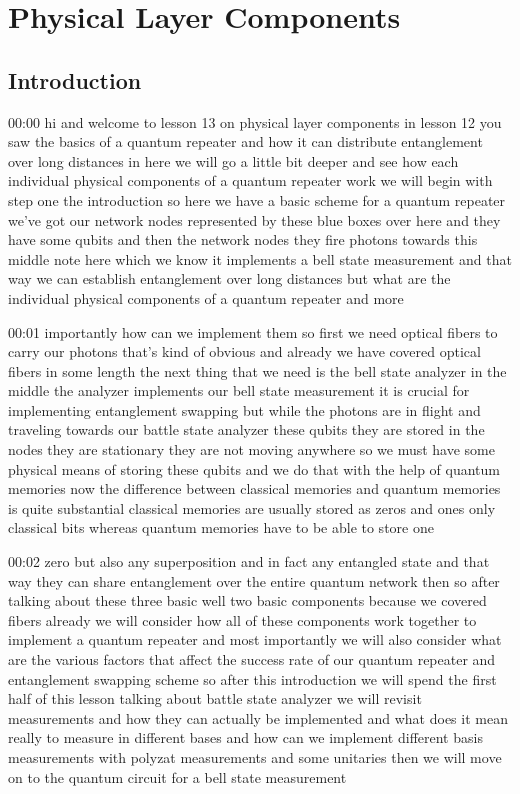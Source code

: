 
\chapter{Physical Layer Components}

\section{Introduction}

00:00
hi and welcome to lesson 13 on physical layer components
in lesson 12 you saw the basics of a quantum repeater and how it can
distribute entanglement over long distances in here we will go a
little bit deeper and see how each individual physical components of a
quantum repeater work we will begin with step one the introduction
so here we have a basic scheme for a quantum repeater we've got our
network nodes represented by these blue boxes over here and they have some
qubits and then the network nodes they fire photons towards this middle
note here which we know it implements a bell state measurement
and that way we can establish entanglement over long distances but what are the
individual physical components of a quantum repeater and more

00:01
importantly how can we implement them so first we need optical fibers to carry
our photons that's kind of obvious and already we have covered
optical fibers in some length the next thing that we need is the bell
state analyzer in the middle the analyzer implements our bell state measurement
it is crucial for implementing entanglement swapping
but while the photons are in flight and traveling towards our battle state
analyzer these qubits they are stored in the nodes
they are stationary they are not moving anywhere so we must have some physical
means of storing these qubits and we do that with the help of
quantum memories now the difference between classical memories and quantum
memories is quite substantial classical memories
are usually stored as zeros and ones only classical bits
whereas quantum memories have to be able to store one

00:02
zero but also any superposition and in fact any entangled state and
that way they can share entanglement over the entire quantum network then so
after talking about these three basic well two basic
components because we covered fibers already we will consider how all of
these components work together to implement a quantum repeater and
most importantly we will also consider what are the various factors that affect
the success rate of our quantum repeater and entanglement swapping scheme
so after this introduction we will spend the first half of this lesson talking
about battle state analyzer we will revisit measurements
and how they can actually be implemented and what does it mean
really to measure in different bases and how can we implement
different basis measurements with polyzat measurements and some unitaries
then we will move on to the quantum circuit for a bell state measurement

